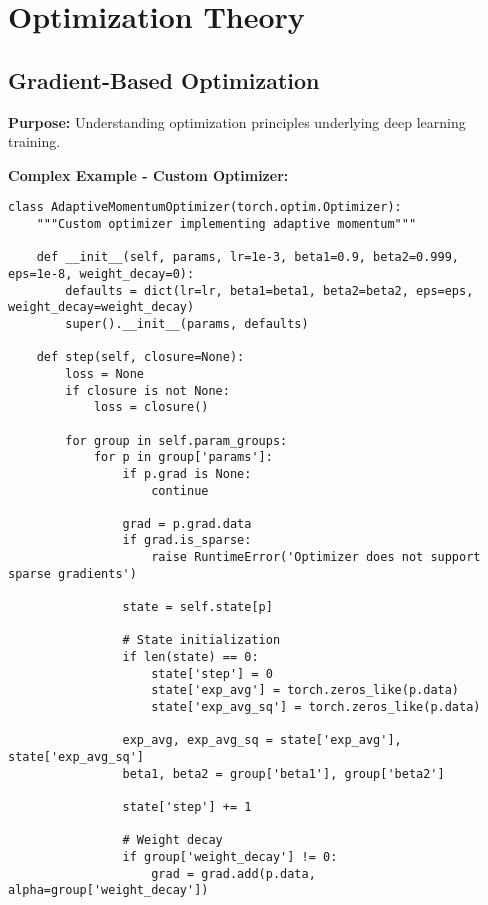 \documentclass[11pt,a4paper]{book}
\begin{document}
\section{Optimization Theory}

\subsection{Gradient-Based Optimization}

\textbf{Purpose:} Understanding optimization principles underlying deep learning training.

\textbf{Complex Example - Custom Optimizer:}
\begin{verbatim}
class AdaptiveMomentumOptimizer(torch.optim.Optimizer):
    """Custom optimizer implementing adaptive momentum"""
    
    def __init__(self, params, lr=1e-3, beta1=0.9, beta2=0.999, eps=1e-8, weight_decay=0):
        defaults = dict(lr=lr, beta1=beta1, beta2=beta2, eps=eps, weight_decay=weight_decay)
        super().__init__(params, defaults)
    
    def step(self, closure=None):
        loss = None
        if closure is not None:
            loss = closure()
        
        for group in self.param_groups:
            for p in group['params']:
                if p.grad is None:
                    continue
                
                grad = p.grad.data
                if grad.is_sparse:
                    raise RuntimeError('Optimizer does not support sparse gradients')
                
                state = self.state[p]
                
                # State initialization
                if len(state) == 0:
                    state['step'] = 0
                    state['exp_avg'] = torch.zeros_like(p.data)
                    state['exp_avg_sq'] = torch.zeros_like(p.data)
                
                exp_avg, exp_avg_sq = state['exp_avg'], state['exp_avg_sq']
                beta1, beta2 = group['beta1'], group['beta2']
                
                state['step'] += 1
                
                # Weight decay
                if group['weight_decay'] != 0:
                    grad = grad.add(p.data, alpha=group['weight_decay'])
                

\end{verbatim}
\end{document}
